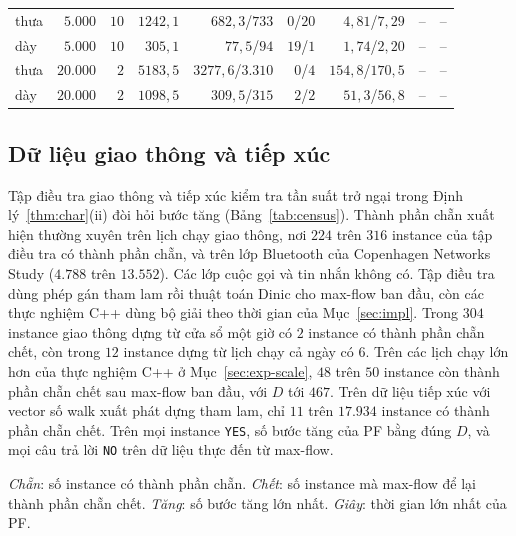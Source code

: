\documentclass[pdflatex,sn-mathphys-num]{sn-jnl}
\theoremstyle{thmstyleone}%
\theoremstyle{thmstyletwo}%
\theoremstyle{thmstylethree}%
\newcommand{\YES}{\texttt{YES}}
\newcommand{\NO}{\texttt{NO}}
\begin{document}
\begin{table}[t]
\begin{tabular*}{\textwidth}{@{\extracolsep\fill}lrrrrrrrr}
thưa & $5.000$ & $10$ & $1242{,}1$ & $682{,}3$/$733$ & $0$/$20$ & $4{,}81$/$7{,}29$ & -- & -- \\
dày & $5.000$ & $10$ & $305{,}1$ & $77{,}5$/$94$ & $19$/$1$ & $1{,}74$/$2{,}20$ & -- & -- \\
thưa & $20.000$ & $2$ & $5183{,}5$ & $3277{,}6$/$3.310$ & $0$/$4$ & $154{,}8$/$170{,}5$ & -- & -- \\
dày & $20.000$ & $2$ & $1098{,}5$ & $309{,}5$/$315$ & $2$/$2$ & $51{,}3$/$56{,}8$ & -- & -- \\
\bottomrule
\end{tabular*}
\end{table}

\subsection{Dữ liệu giao thông và tiếp xúc}\label{sec:exp-real}

Tập điều tra giao thông và tiếp xúc kiểm tra tần suất trở ngại trong Định lý~\ref{thm:char}(ii) đòi hỏi bước tăng (Bảng~\ref{tab:census}). Thành phần chẵn xuất hiện thường xuyên trên lịch chạy giao thông, nơi $224$ trên $316$ instance của tập điều tra có thành phần chẵn, và trên lớp Bluetooth của Copenhagen Networks Study ($4.788$ trên $13.552$). Các lớp cuộc gọi và tin nhắn không có. Tập điều tra dùng phép gán tham lam rồi thuật toán Dinic cho max-flow ban đầu, còn các thực nghiệm C++ dùng bộ giải theo thời gian của Mục~\ref{sec:impl}. Trong $304$ instance giao thông dựng từ cửa sổ một giờ có $2$ instance có thành phần chẵn chết, còn trong $12$ instance dựng từ lịch chạy cả ngày có $6$. Trên các lịch chạy lớn hơn của thực nghiệm C++ ở Mục~\ref{sec:exp-scale}, $48$ trên $50$ instance còn thành phần chẵn chết sau max-flow ban đầu, với $D$ tới $467$. Trên dữ liệu tiếp xúc với vector số walk xuất phát dựng tham lam, chỉ $11$ trên $17.934$ instance có thành phần chẵn chết. Trên mọi instance \YES{}, số bước tăng của PF bằng đúng $D$, và mọi câu trả lời \NO{} trên dữ liệu thực đến từ max-flow.

\emph{Chẵn}: số instance có thành phần chẵn. \emph{Chết}: số instance mà max-flow để lại thành phần chẵn chết. \emph{Tăng}: số bước tăng lớn nhất. \emph{Giây}: thời gian lớn nhất của PF.
\end{document}

